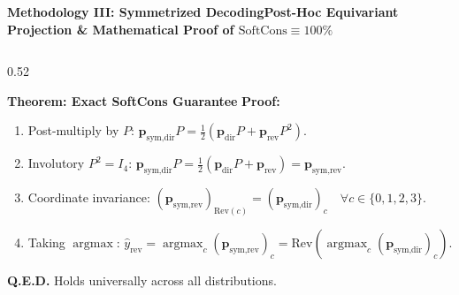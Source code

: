 \documentclass[aspectratio=169,10pt]{beamer}
\begin{document}
\begin{frame}{\textbf{Methodology III: Symmetrized Decoding}}{\textbf{Post-Hoc Equivariant Projection \& Mathematical Proof of $\text{SoftCons} \equiv 100\%$}}
\begin{columns}[T]
\begin{column}{0.52\textwidth}
\begin{exampleblock}{\textbf{Theorem: Exact SoftCons Guarantee}}
        \smallskip
        \textbf{Proof:}
        \begin{enumerate}\setlength{\itemsep}{1pt}\setlength{\parskip}{0pt}\setlength{\topsep}{1pt}
          \item Post-multiply by $P$: $\mathbf{p}_{\text{sym,dir}} P = \tfrac{1}{2}(\mathbf{p}_{\text{dir}} P + \mathbf{p}_{\text{rev}} P^2)$.
          \item Involutory $P^2 = I_4$: $\mathbf{p}_{\text{sym,dir}} P = \tfrac{1}{2}(\mathbf{p}_{\text{dir}} P + \mathbf{p}_{\text{rev}}) = \mathbf{p}_{\text{sym,rev}}$.
          \item Coordinate invariance: $(\mathbf{p}_{\text{sym,rev}})_{\text{Rev}(c)} = (\mathbf{p}_{\text{sym,dir}})_c \quad \forall c \in \{0, 1, 2, 3\}$.
          \item Taking $\operatorname{argmax}$: $\hat{y}_{\text{rev}} = \operatorname{argmax}_c (\mathbf{p}_{\text{sym,rev}})_c = \text{Rev}\left(\operatorname{argmax}_{c} (\mathbf{p}_{\text{sym,dir}})_{c}\right)$.
        \end{enumerate}
        \vskip 1pt
        \textbf{Q.E.D.} Holds universally across all distributions.
      \end{exampleblock}
    \end{column}
  \end{columns}
\end{frame}
\end{document}
